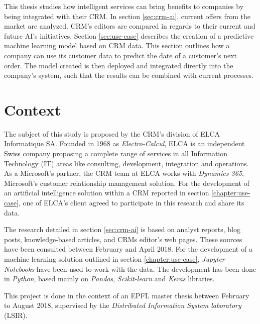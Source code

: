 This thesis studies how intelligent services can bring benefits to companies by being integrated with their CRM. In section \ref{sec:crm-ai}, current offers from the market are analyzed. CRM's editors are compared in regards to their current and future AI's initiatives. Section \ref{sec:use-case} describes the creation of a predictive machine learning model based on CRM data. This section outlines how a company can use its customer data to predict the date of a customer's next order. The model created is then deployed and integrated directly into the company's system, such that the results can be combined with current processes.

\section{Context}
The subject of this study is proposed by the CRM's division of ELCA Informatique SA. Founded in 1968 as \textit{Electro-Calcul}, ELCA is an independent Swiss company proposing a complete range of services in all Information Technology (IT) areas like consulting, development, integration and operations. As a Microsoft's partner, the CRM team at ELCA works with \textit{Dynamics 365}, Microsoft's customer relationship management solution.
For the development of an artificial intelligence solution within a CRM reported in section \ref{chapter:use-case}, one of ELCA's client agreed to participate in this research and share its data.

The research detailed in section \ref{sec:crm-ai} is based on analyst reports, blog posts, knowledge-based articles, and CRMs editor's web pages. These sources have been consulted between February and April 2018. For the development of a machine learning solution outlined in section \ref{chapter:use-case}, \textit{Jupyter Notebooks} have been used to work with the data. The development has been done in \textit{Python}, based mainly on \textit{Pandas}, \textit{Scikit-learn} and \textit{Keras} libraries.

This project is done in the context of an EPFL master thesis between February to August 2018, supervised by the \textit{Distributed Information System laboratory} (LSIR).
